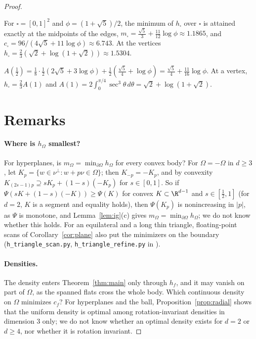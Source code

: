 \begin{proof}
\begin{corollary}\label{cor:square}
For $\square=[0,1]^2$ and $\phi=(1+\sqrt5)/2$, the minimum of $h_\square$ over $\square$ is attained exactly at the midpoints of
the edges, $m_\square=\frac{\sqrt5}3+\frac{11}{12}\log\phi\approx1.1865$, and $c_\square=96/(4\sqrt5+11\log\phi)\approx6.743$. At the
vertices $h_\square=\frac23(\sqrt2+\log(1+\sqrt2))\approx1.5304$.
\end{corollary}
$A(\frac12)=\frac18\cdot\frac12(2\sqrt5+3\log\phi)+\frac12(\frac{\sqrt5}4+\log\phi)=\frac{\sqrt5}4+\frac{11}{16}\log\phi$. At a vertex,
$h_\square=\frac23A(1)$ and $A(1)=2\int_0^{\pi/4}\sec^3\theta\,d\theta=\sqrt2+\log(1+\sqrt2)$.

\section{Remarks}\label{sec:remarks}

\paragraph{Where is $h_\Omega$ smallest?} For hyperplanes, is $m_\Omega=\min_{\partial\Omega}h_\Omega$ for every convex body? For $\Omega=-\Omega$
in $d\ge3$, let $K_p=\{w\in\nu^\perp:w+p\nu\in\Omega\}$; then $K_{-p}=-K_p$, and by convexity $K_{(2s-1)p}\supseteq sK_p+(1-s)(-K_p)$ for
$s\in[0,1]$. So if $\Psi(sK+(1-s)(-K))\ge\Psi(K)$ for convex $K\subset\R^{d-1}$ and $s\in[\frac12,1]$ (for $d=2$, $K$ is a segment and
equality holds), then $\Psi(K_p)$ is nonincreasing in $|p|$, as $\Psi$ is monotone, and Lemma~\ref{lem:ig}(c) gives
$m_\Omega=\min_{\partial\Omega}h_\Omega$; we do not know whether this holds. For an equilateral and a long thin triangle, floating-point scans of
Corollary~\ref{cor:plane} also put the minimizers on the boundary (\texttt{h\_triangle\_scan.py}, \texttt{h\_triangle\_refine.py}
in \cite{Repo}).

\paragraph{Densities.} The density enters Theorem~\ref{thm:main} only through $h_f$, and it may vanish on part of $\Omega$, as the
spanned flats cross the whole body. Which continuous density on $\Omega$ minimizes $c_f$? For hyperplanes and the ball,
Proposition~\ref{prop:radial} shows that the uniform density is optimal among rotation-invariant densities in dimension $3$ only;
we do not know whether an optimal density exists for $d=2$ or $d\ge4$, nor whether it is rotation invariant.


\end{proof}
